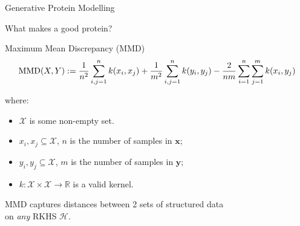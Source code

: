 \documentclass[aspectratio=169, 10pt, dvipsnames]{beamer}
\def\xlist{4}
\def\ylist{4}
\newcommand{\fillrandomly}[7]{
  \pgfmathsetmacro\diameter{#3*2}
  \foreach \i in {1,...,#4}{
    \pgfmathsetmacro\x{rnd*#1}
    \pgfmathsetmacro\y{rnd*#2}
    \xdef\collision{0}
    \foreach \element [count=\i] in \xlist{
      \pgfmathtruncatemacro\j{\i-1}
      \pgfmathsetmacro\checkdistance{ sqrt( ({\xlist}[\j]-(\x))^2 + ({\ylist}[\j]-(\y))^2 ) }
      \ifdim\checkdistance pt<\diameter pt
        \xdef\collision{1}
        \breakforeach
      \fi
    }
    \ifnum\collision=0
      \xdef\xlist{\xlist,\x}
      \xdef\ylist{\ylist,\y}
      \draw [#5, fill=#5] (\x + #6,\y+ #7) circle [radius=#3];
    \fi

  }
}
\newcommand\arrowfromto[5][blue]{%
  \draw[#1] #2 -- ( $ #2!#4!#3 $ ) node [midway, sloped, above] {#5}}
\begin{document}
\begin{frame}[fragile]{Generative Protein Modelling}
\begin{figure}

  \end{figure}
\end{frame}

\begin{frame}[standout]
  What makes a good protein?
\end{frame}

\begin{frame}[fragile]{Maximum Mean Discrepancy (MMD)}
  \begin{equation*}
    \text{MMD}(X, Y) := {1\over n^2} \sum_{i,j=1}^{n}k(x_i, x_j) + {1\over m^2} \sum_{i,j=1}^{n}k(y_i, y_j) - {2\over nm} \sum_{i=1}^{n}\sum_{j=1}^{m}k(x_i, y_j)
  \end{equation*}
  \begin{minipage}{0.28\textwidth}
    \begin{figure}
      \begin{flushleft}
    \end{flushleft}
  \end{figure}
  \end{minipage}
  \hfill
  \begin{minipage}{0.65\textwidth}
    where:
    \begin{itemize}
    \item $\mathcal{X}$ is some non-empty set.
    \item  $x_i, x_j \subseteq \mathcal{X}$, $n$ is the number of samples in $\mathbf{x}$;
    \item  $y_i, y_j \subseteq \mathcal{X}$, $m$ is the number of samples in $\mathbf{y}$;
    \item $k: \mathcal{X}\times\mathcal{X}\to\mathbb{R}$ is a valid kernel.
    \end{itemize}

    \small MMD captures distances between 2 sets of structured data\\ on
    \emph{any} RKHS $\mathcal{H}$.

  \end{minipage}
\end{frame}
\end{document}
